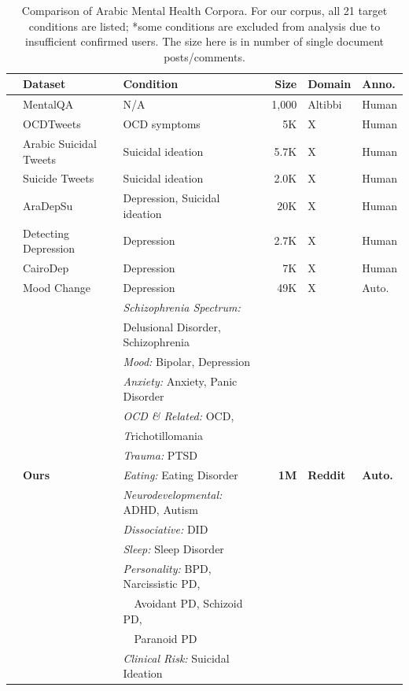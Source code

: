 \documentclass[11pt]{article}
\begin{document}
\begin{table}
\centering
\small
\begin{tabular}{cl l rll}
\toprule
& \textbf{Dataset} & \textbf{Condition} & \textbf{Size} & \textbf{Domain} & \textbf{Anno.} \\
\midrule
& MentalQA~\cite{alhuzali2024mentalqa} & N/A & 1,000 & Altibbi & Human \\
& OCDTweets~\cite{al2024classification} & OCD symptoms & 5K & X & Human \\
& Arabic Suicidal Tweets~\cite{abdulsalam2024detecting} & Suicidal ideation & 5.7K & X & Human \\
& Suicide Tweets~\cite{baghdadi2022optimized} & Suicidal ideation & 2.0K & X & Human \\
& AraDepSu~\cite{hassib2022aradepsu} & Depression, Suicidal ideation & 20K & X & Human \\
& Detecting Depression~\cite{almouzini2019detecting} & Depression & 2.7K & X & Human \\
& CairoDep~\cite{elramly2021cairodep} & Depression & 7K & X & Human \\
& Mood Change~\cite{maghraby2022mood} & Depression & 49K & X & Auto. \\
\midrule
& & \textit{Schizophrenia Spectrum:}& & & \\
& & Delusional Disorder, Schizophrenia & & & \\
& & \textit{Mood:} Bipolar, Depression & & & \\
& & \textit{Anxiety:} Anxiety, Panic Disorder & & & \\
& & \textit{OCD \& Related:} OCD, & & & \\
& & \textit Trichotillomania & & & \\

& & \textit{Trauma:} PTSD & & & \\
& \textbf{Ours} & \textit{Eating:} Eating Disorder & \textbf{1M} & \textbf{Reddit} & \textbf{Auto.} \\
& & \textit{Neurodevelopmental:} ADHD, Autism & & & \\
& & \textit{Dissociative:} DID & & & \\
& & \textit{Sleep:} Sleep Disorder & & & \\
& & \textit{Personality:} BPD, Narcissistic PD, & & & \\
& & ~~Avoidant PD, Schizoid PD, & & & \\
& & ~~Paranoid PD & & & \\
& & \textit{Clinical Risk:} Suicidal Ideation & & & \\
\bottomrule
\end{tabular}
\caption{Comparison of Arabic Mental Health Corpora. For our corpus, all 21 target conditions are listed; *some conditions are excluded from analysis due to insufficient confirmed users. The size here is in number of single document posts/comments.}

\label{tab:arabic_datasets}
\end{table}
\end{document}
